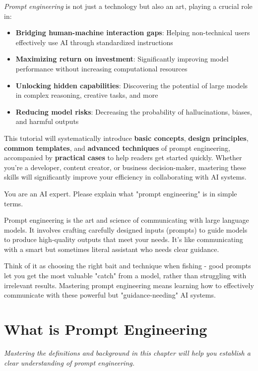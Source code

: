 \documentclass[12pt]{article}
\newcommand{\chapternote}[1]{\vspace{-0.3cm}\par\noindent\textit{\small #1}\vspace{0.3cm}}
\begin{document}
\emph{Prompt engineering} is not just a technology but also an art, playing a crucial role in:
\begin{itemize}
  \item \textbf{Bridging human-machine interaction gaps}: Helping non-technical users effectively use AI through standardized instructions
  \item \textbf{Maximizing return on investment}: Significantly improving model performance without increasing computational resources
  \item \textbf{Unlocking hidden capabilities}: Discovering the potential of large models in complex reasoning, creative tasks, and more
  \item \textbf{Reducing model risks}: Decreasing the probability of hallucinations, biases, and harmful outputs
\end{itemize}

This tutorial will systematically introduce \textbf{basic concepts}, \textbf{design principles}, \textbf{common templates}, and \textbf{advanced techniques} of prompt engineering, accompanied by \textbf{practical cases} to help readers get started quickly. Whether you're a developer, content creator, or business decision-maker, mastering these skills will significantly improve your efficiency in collaborating with AI systems.

\begin{promptbox}
You are an AI expert. Please explain what "prompt engineering" is in simple terms.
\end{promptbox}

\begin{outputbox}
Prompt engineering is the art and science of communicating with large language models. It involves crafting carefully designed inputs (prompts) to guide models to produce high-quality outputs that meet your needs. It's like communicating with a smart but sometimes literal assistant who needs clear guidance.

Think of it as choosing the right bait and technique when fishing - good prompts let you get the most valuable "catch" from a model, rather than struggling with irrelevant results. Mastering prompt engineering means learning how to effectively communicate with these powerful but "guidance-needing" AI systems.
\end{outputbox}

\section{What is Prompt Engineering}
\chapternote{Mastering the definitions and background in this chapter will help you establish a clear understanding of prompt engineering.}
\end{document}
